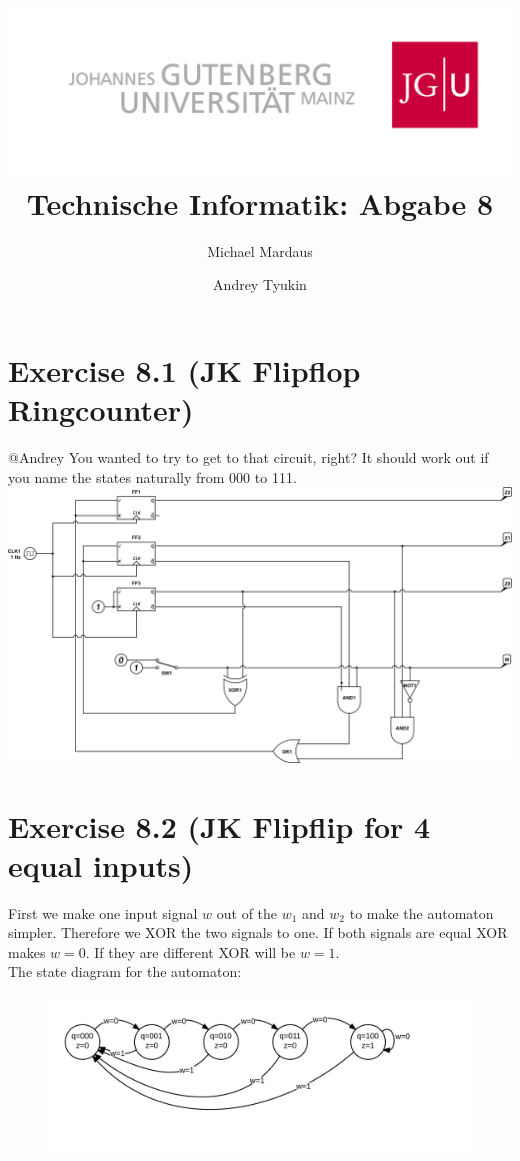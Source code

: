 \documentclass[10pt,a4paper]{scrartcl}
\author{Michael Mardaus \and Andrey Tyukin}
\title{\includegraphics[scale=0.2]{../logo_schriftzug}\\
Technische Informatik: Abgabe 8}
\begin{document}
\maketitle

\section*{Exercise 8.1 (JK Flipflop Ringcounter)}
@Andrey You wanted to try to get to that circuit, right? It should work out if you name the states naturally from 000 to 111.\\
\includegraphics[width=\textwidth]{images/8_1-ringcounter-jk.png} 

\FloatBarrier
\section*{Exercise 8.2 (JK Flipflip for 4 equal inputs)}

First we make one input signal $w$ out of the $w_1$ and $w_2$ to make the automaton simpler. Therefore we XOR the two signals to one.
If both signals are equal XOR makes $w=0$. If they are different XOR will be $w=1$.\\
The state diagram for the automaton:

\begin{figure}[h]
\includegraphics[width=\textwidth]{images/8_2-automat.png} 
\end{figure}
\end{document}
